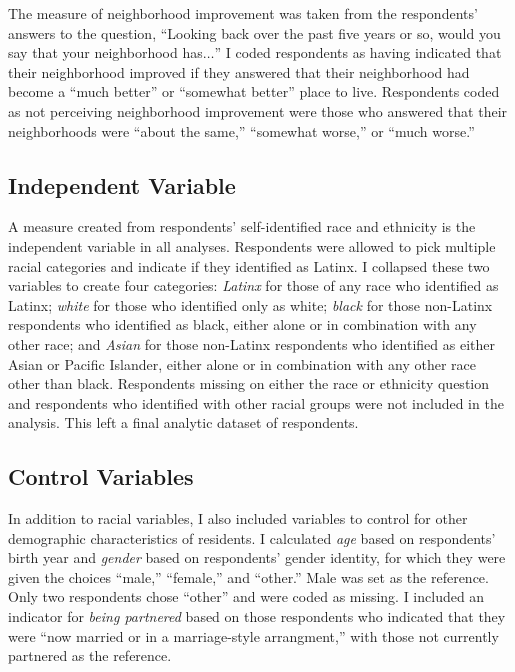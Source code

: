 \documentclass{baderart}
\newcommand{\TK}[1][]{\strong{TK #1}}
\begin{document}
The measure of neighborhood improvement was taken from the respondents' answers to the question, ``Looking back over the past five years or so, would you say that your neighborhood has\(\ldots\)'' I coded respondents as having indicated that their neighborhood improved if they answered that their neighborhood had become a ``much better'' or ``somewhat better'' place to live. Respondents coded as not perceiving neighborhood improvement were those who answered that their neighborhoods were ``about the same,'' ``somewhat worse,'' or ``much worse.''

\subsection{Independent Variable}\label{independent-variable}

A measure created from respondents' self-identified race and ethnicity is the independent variable in all analyses. Respondents were allowed to pick multiple racial categories and indicate if they identified as Latinx. I collapsed these two variables to create four categories: \emph{Latinx} for those of any race who identified as Latinx; \emph{white} for those who identified only as white; \emph{black} for those non-Latinx respondents who identified as black, either alone or in combination with any other race; and \emph{Asian} for those non-Latinx respondents who identified as either Asian or Pacific Islander, either alone or in combination with any other race other than black. Respondents missing on either the race or ethnicity question and respondents who identified with other racial groups were not included in the analysis. This left a final analytic dataset of \TK[N] respondents.

\subsection{Control Variables}\label{control-variables}

In addition to racial variables, I also included variables to control for other demographic characteristics of residents. I calculated \emph{age} based on respondents' birth year and \emph{gender} based on respondents' gender identity, for which they were given the choices ``male,'' ``female,'' and ``other.'' Male was set as the reference. Only two respondents chose ``other'' and were coded as missing. I included an indicator for \emph{being partnered} based on those respondents who indicated that they were ``now married or in a marriage-style arrangment,'' with those not currently partnered as the reference.
\end{document}
